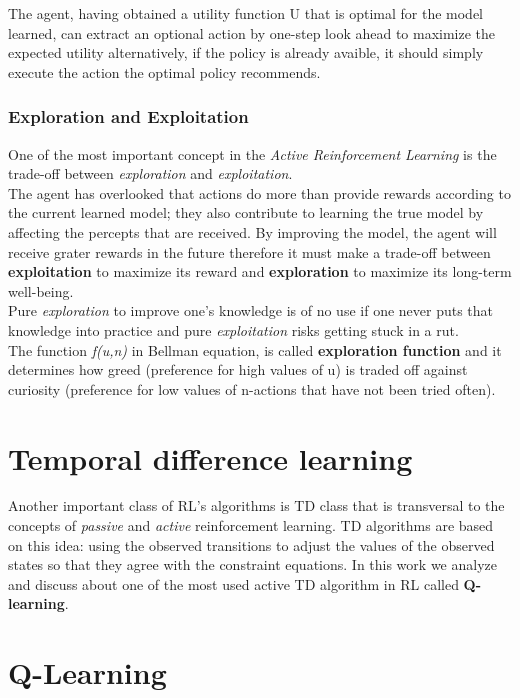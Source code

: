 \documentclass[]{report}
\begin{document}
The agent, having obtained a utility function U that is optimal for the
model learned, can extract an optional action by one-step look ahead to
maximize the expected utility alternatively, if the policy is already
avaible, it should simply execute the action the optimal policy
recommends.

\subsubsection{Exploration and Exploitation}\label{exploration-and-exploitation}

One of the most important concept in the \emph{Active Reinforcement
Learning} is the trade-off between \emph{exploration} and
\emph{exploitation}.\\
The agent has overlooked that actions do more than provide rewards
according to the current learned model; they also contribute to learning
the true model by affecting the percepts that are received. By improving
the model, the agent will receive grater rewards in the future therefore
it must make a trade-off between \textbf{exploitation} to maximize its
reward and \textbf{exploration} to maximize its long-term well-being.\\
Pure \emph{exploration}  to improve one's knowledge is of no use if one never
puts that knowledge into practice and pure \emph{exploitation} risks getting stuck in a rut.\\
The function \emph{f(u,n)} in Bellman equation, is called
\textbf{exploration function} and it determines how greed (preference
for high values of u) is traded off against curiosity (preference for
low values of n-actions that have not been tried often).

\section{Temporal difference learning}
Another important class of RL's algorithms is TD class that is transversal to the concepts of \emph{passive} and \emph{active} reinforcement learning.
TD algorithms are based on this idea: using the observed transitions to adjust the values of the observed states so that they agree with the constraint equations.
In this work we analyze and discuss about one of the most used active TD algorithm in RL called \textbf{Q-learning}.

\section{Q-Learning}
\end{document}
